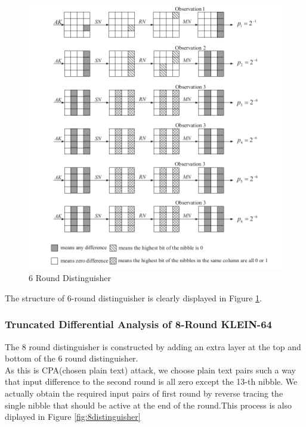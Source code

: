 \documentclass[preprint]{transcrypto}
\begin{document}
\begin{figure}
    \centering
    \includegraphics[width= \textwidth]{images/6roundattack.png}
    \caption{6 Round Distinguisher \cite{reduced_round}}
    \label{fig:6distinguisher}
\end{figure}
The structure of 6-round distinguisher is clearly displayed in Figure \ref{fig:6distinguisher}.\\
\subsubsection{Truncated Differential Analysis of 8-Round KLEIN-64}
The 8 round distinguisher is constructed by adding an extra layer at the top and bottom of the 6 round distinguisher.\\
As this is CPA(chosen plain text) attack, we choose plain text pairs such a way that input difference to the second round is all zero except the 13-th nibble. We actually obtain the required input pairs of first round by reverse tracing the single nibble that should be active at the end of the round.This process is also diplayed in Figure \ref{fig:8distinguisher} \\
\end{document}
